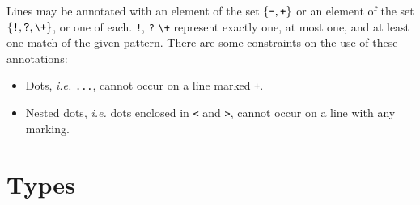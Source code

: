 \documentclass{article}
\newcommand{\mita}[1]{\mbox{\it{{#1}}}}
\newcommand{\mtt}[1]{\mbox{\tt{{#1}}}}
\newcommand{\msf}[1]{\mbox{\sf{{#1}}}}
\begin{document}


\noindent
Lines may be annotated with an element of the set $\{\mtt{-},
\mtt{+}\}$ {\color{red} or an element of the set $\{\mtt{!}, \mtt{?},
\verb-\+-\}$, or one of each.  \mtt{!}, \mtt{?} \verb-\+-
represent exactly one, at most one, and at least one match of
  the given pattern}.  There are some constraints on the use of these
annotations:
\begin{itemize}
\item Dots, {\em i.e.} \texttt{...}, cannot occur on a line marked
  \texttt{+}.
\item Nested dots, {\em i.e.} dots enclosed in {\tt <} and {\tt >}, cannot
  occur on a line with any marking.
\end{itemize}


\section{Types}
\label{types}
\end{document}
